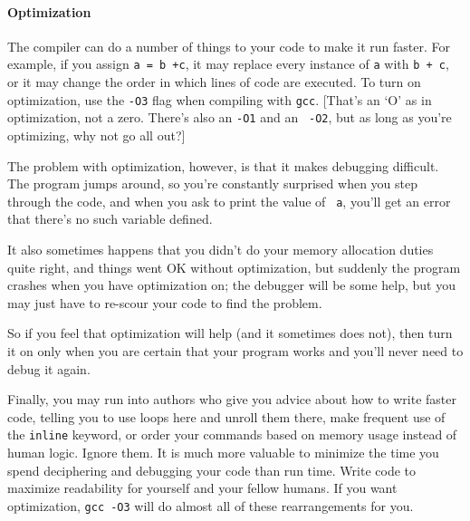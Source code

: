 \documentclass[12pt]{article}
\makeatletter
\def\ind#1{\index{#1}#1}
\def\ttind#1{\index{#1@{\tt #1}}{\tt #1}}
\makeatother
\begin{document}
\paragraph{Optimization}
The \ttind{gcc} compiler can do a number of things to your code to make it
run faster. For example, if you assign {\tt a = b +c}, it may replace
every instance of {\tt a} with {\tt b + c}, or it may change the order
in which lines of code are executed. To turn on \ind{optimization},
use the {\tt -O3} flag when compiling with {\tt gcc}. [That's an `O'
as in optimization, not a zero. There's also an {\tt -O1} and an {\tt
-O2}, but as long as you're optimizing, why not go all out?]

The problem with optimization, however, is that it makes debugging
difficult. The program jumps around, so you're constantly surprised when
you step through the code, and when you ask to print the value of {\tt
a}, you'll get an error that there's no such variable defined.

It also sometimes happens that you didn't do your memory allocation duties
quite right, and things went OK without optimization, but suddenly the
program crashes when you have optimization on; the debugger will be some
help, but you may just have to re-scour your code to find the problem.

So if you feel that optimization will help (and it sometimes does not),
then turn it on only when you are certain that your program works and
you'll never need to debug it again.

Finally, you may run into authors who give you advice about how to write
faster code, telling you to use loops here and unroll them there, make
frequent use of the {\tt inline} keyword, or order your commands based
on memory usage instead of human logic. Ignore them. It is much more
valuable to minimize the time you spend deciphering and debugging your
code than run time.  Write code to maximize readability for yourself
and your fellow humans. If you want optimization, {\tt gcc -O3} will
do almost all of these rearrangements for you.

\label{end_c_crash}
\ifbook \else
\printindex
\end{document}
